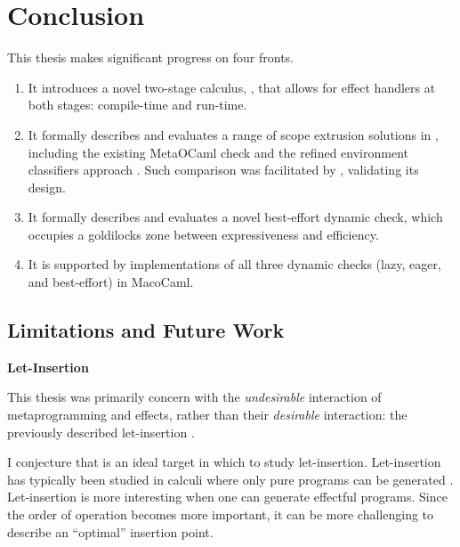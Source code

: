\chapter{Conclusion}

This thesis makes significant progress on four fronts. 

\begin{enumerate}
\item It introduces a novel two-stage calculus, \calculusName{}, that allows for effect handlers at both stages: compile-time and run-time.

\item It formally describes and evaluates a range of scope extrusion solutions in \calculusName{}, including the existing MetaOCaml check \citep{kiselyov-14} and the refined environment classifiers approach \citep{kiselyov-16}. Such comparison was facilitated by \calculusName{}, validating its design.

\item It formally describes and evaluates a novel best-effort dynamic check, which occupies a goldilocks zone between expressiveness and efficiency.

\item It is supported by implementations of all three dynamic checks (lazy, eager, and best-effort) in MacoCaml. 
\end{enumerate}

\section{Limitations and Future Work}
\begin{minipage}[t]{0.25\textwidth}
  \textbf{\textsf{Let-Insertion}}
\end{minipage}%
\begin{minipage}[t]{0.75\textwidth}
  This thesis was primarily concern with the \textit{undesirable} interaction of metaprogramming and effects, rather than their \textit{desirable} interaction: the previously described let-insertion \citep{yallop-2019}. 
  \vspace{2mm}

  I conjecture that \calculusName{} is an ideal target in which to study let-insertion. Let-insertion has typically been studied in calculi where only pure programs can be generated \citep{isoda-24}. Let-insertion is more interesting when one can generate effectful programs. Since the order of operation becomes more important, it can be more challenging to describe an ``optimal'' insertion point.
  \vspace{4mm}
\end{minipage}\\

